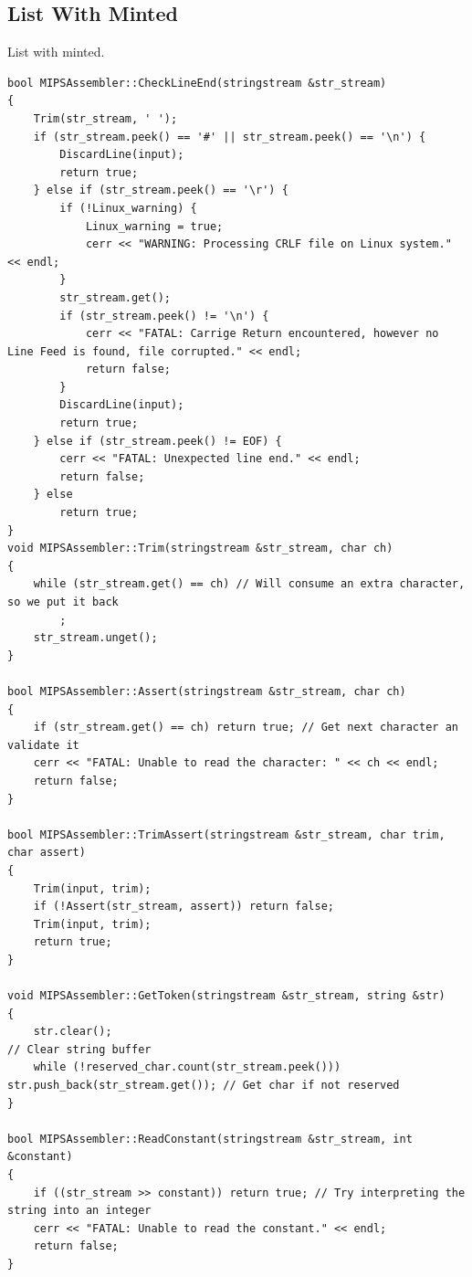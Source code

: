 \documentclass{article}
\begin{document}
\subsection{List With Minted}
\newenvironment{longlisting}{\captionsetup{type=listing}}{}
\begin{longlisting}
    \caption{List with minted.}
    \begin{verbatim}
bool MIPSAssembler::CheckLineEnd(stringstream &str_stream)
{
    Trim(str_stream, ' ');
    if (str_stream.peek() == '#' || str_stream.peek() == '\n') {
        DiscardLine(input);
        return true;
    } else if (str_stream.peek() == '\r') {
        if (!Linux_warning) {
            Linux_warning = true;
            cerr << "WARNING: Processing CRLF file on Linux system." << endl;
        }
        str_stream.get();
        if (str_stream.peek() != '\n') {
            cerr << "FATAL: Carrige Return encountered, however no Line Feed is found, file corrupted." << endl;
            return false;
        }
        DiscardLine(input);
        return true;
    } else if (str_stream.peek() != EOF) {
        cerr << "FATAL: Unexpected line end." << endl;
        return false;
    } else
        return true;
}
void MIPSAssembler::Trim(stringstream &str_stream, char ch)
{
    while (str_stream.get() == ch) // Will consume an extra character, so we put it back
        ;
    str_stream.unget();
}

bool MIPSAssembler::Assert(stringstream &str_stream, char ch)
{
    if (str_stream.get() == ch) return true; // Get next character an validate it
    cerr << "FATAL: Unable to read the character: " << ch << endl;
    return false;
}

bool MIPSAssembler::TrimAssert(stringstream &str_stream, char trim, char assert)
{
    Trim(input, trim);
    if (!Assert(str_stream, assert)) return false;
    Trim(input, trim);
    return true;
}

void MIPSAssembler::GetToken(stringstream &str_stream, string &str)
{
    str.clear();                                                                     // Clear string buffer
    while (!reserved_char.count(str_stream.peek())) str.push_back(str_stream.get()); // Get char if not reserved
}

bool MIPSAssembler::ReadConstant(stringstream &str_stream, int &constant)
{
    if ((str_stream >> constant)) return true; // Try interpreting the string into an integer
    cerr << "FATAL: Unable to read the constant." << endl;
    return false;
}


\end{verbatim}
\end{longlisting}
\end{document}
